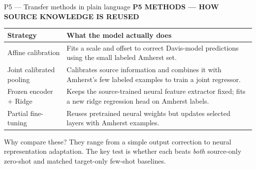 \documentclass[aspectratio=169,11pt]{beamer}
\newcommand{\sectiontag}[1]{{\footnotesize\usebeamercolor[fg]{structure}\textbf{#1}}\par\vspace{0.10cm}}
\begin{document}
\begin{frame}{P5 — Transfer methods in plain language}
\sectiontag{P5 \quad METHODS — HOW SOURCE KNOWLEDGE IS REUSED}
{\small\renewcommand{\arraystretch}{1.25}
\begin{tabularx}{\linewidth}{@{}P{3.25cm}Y@{}}\toprule
\textbf{Strategy} & \textbf{What the model actually does}\\\midrule
Affine calibration & Fits a scale and offset to correct Davis-model predictions using the small labeled Amherst set.\\
Joint calibrated pooling & Calibrates source information and combines it with Amherst's few labeled examples to train a joint regressor.\\
Frozen encoder $+$ Ridge & Keeps the source-trained neural feature extractor fixed; fits a new ridge regression head on Amherst labels.\\
Partial fine-tuning & Reuses pretrained neural weights but updates selected layers with Amherst examples.\\
\bottomrule\end{tabularx}}
\vspace{0.18cm}
\begin{block}{Why compare these?}
\footnotesize They range from a simple output correction to neural representation adaptation. The key test is whether each beats \emph{both} source-only zero-shot and matched target-only few-shot baselines.
\end{block}
\end{frame}
\end{document}
